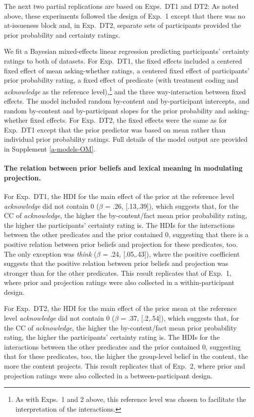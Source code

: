 \documentclass[11pt,fleqn]{article}
\newcommand{\6}{\mbox{$[\hspace*{-.6mm}[$}}
\newcommand{\9}{\mbox{$]\hspace*{-.6mm}]$}}
\begin{document}
The next two partial replications are based on Exps.~DT1 and DT2: As noted above, these experiments followed the design of Exp.~1 except that there was no at-issueness block and, in Exp.~DT2, separate sets of participants provided the prior probability and certainty ratings.

We fit a Bayesian mixed-effects linear regression predicting participants' certainty ratings to both of  datasets. For Exp.~DT1, the fixed effects included a centered fixed effect of mean asking-whether ratings, a centered fixed effect of participants' prior probability rating, a fixed effect of predicate (with treatment coding and {\em acknowledge} as the reference level),\footnote{As with Exps.~1 and 2 above, this reference level was chosen to facilitate the interpretation of the interactions.} and the three way-interaction between fixed effects. The model included random by-content and by-participant intercepts, and random by-content and by-participant slopes for the prior probability and asking-whether fixed effects. For Exp.~DT2, the fixed effects were the same as for Exp.~DT1 except that the prior predictor was based on mean rather than individual prior probability ratings. Full details of the model output are provided in Supplement \ref{a-models-OM}.

\paragraph{The relation between prior beliefs and lexical meaning in modulating projection.} For Exp.~DT1, the HDI for the main effect of the prior at the reference level {\em acknowledge} did not contain 0 ($\beta$ = .26, [.13,.39]), which suggests that, for the CC of {\em acknowledge}, the higher the by-content/fact mean prior probability rating, the higher the participants' certainty rating is. The HDIs for the interactions between the other predicates and the prior contained 0, suggesting that there is a positive relation between prior beliefs and projection for these predicates, too. The only exception was {\em think} ($\beta$ = .24, [.05,.43]), where the positive coefficient suggests that the positive relation between prior beliefs and projection was stronger than for the other predicates. This result replicates that of Exp.~1, where prior and projection ratings were also collected in a within-participant design.

For Exp.~DT2, the HDI for the main effect of the prior mean at the reference level {\em acknowledge} did not contain 0 ($\beta$ = .37, [.2,.54]), which suggests that, for the CC of {\em acknowledge}, the higher the by-content/fact mean prior probability rating, the higher the participants' certainty rating is. The HDIs for the interactions between the other predicates and the prior contained 0, suggesting that for these predicates, too, the higher the group-level belief in the content, the more the content projects. This result replicates that of Exp.~2, where prior and projection ratings were also collected in a between-participant design.
\end{document}
